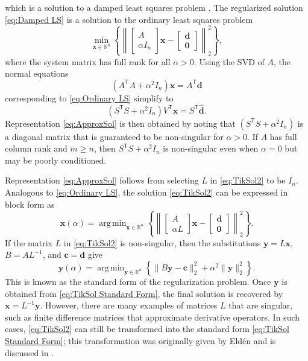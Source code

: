 \documentclass[12pt]{article}
\newcommand{\mA}{m}	%
\newcommand{\cVec}{\mathbf{c}}	%
\newcommand{\dVec}{\mathbf{d}}	%
\newcommand{\xVec}{\mathbf{x}}	%
\newcommand{\trans}[1]{{#1}^\mathsf{T}}	%
\newcommand{\regparam}{\alpha}  %
\DeclareMathOperator*{\argmin}{arg\,min}
\newcommand{\zeroVec}{\bm{0}}	%
\newcommand{\svd}[1]{\widehat{#1}}	%
\begin{document}
which is a solution to a damped least squares problem \cite{ABT}. The regularized solution \eqref{eq:Damped LS} is a solution to the ordinary least squares problem
\begin{equation}
\label{eq:Ordinary LS}
\min_{\xVec \in \mathbb{R}^n} \left\{\left\|
\begin{bmatrix}
A \\
\regparam I_n
\end{bmatrix}\xVec - 
\begin{bmatrix}
\dVec \\
\zeroVec
\end{bmatrix}
\right\|_2^2\right\},
\end{equation}
where the system matrix has full rank for all $\regparam > 0$. Using the SVD of $A$, the normal equations 
\[(\trans{A}A + \regparam^2 I_n)\xVec = \trans{A}\dVec\]
corresponding to \eqref{eq:Ordinary LS} simplify to
\[(\trans{S}S + \regparam^2 I_n)\trans{V}\xVec = \trans{S}\svd{\dVec}.\]
Representation \eqref{eq:ApproxSol} is then obtained by noting that $(\trans{S}S + \regparam^2 I_n)$ is a diagonal matrix that is guaranteed to be non-singular for $\regparam > 0$. If $A$ has full column rank and $\mA \geq n$, then $\trans{S}S + \regparam^2 I_n$ is non-singular even when $\regparam = 0$ but may be poorly conditioned. \par
Representation \eqref{eq:ApproxSol} follows from selecting $L$ in \eqref{eq:TikSol2} to be $I_n$. Analogous to \eqref{eq:Ordinary LS}, the solution \eqref{eq:TikSol2} can be expressed in block form as
\begin{equation}
\xVec(\regparam) = \argmin_{\xVec \in \mathbb{R}^n} \left\{\left\| \begin{bmatrix}
A \\
\regparam L
\end{bmatrix}\xVec - \begin{bmatrix}
\dVec \\
\bm{0}
\end{bmatrix} \right\|_2^2\right\}.
\label{eq:TikSol3}
\end{equation}
If the matrix $L$ in \eqref{eq:TikSol2} is non-singular, then the substitutions $\mathbf{y} = L\xVec$, $B = A{L}^{-1}$, and $\cVec = \dVec$ give
\begin{equation}
\mathbf{y}(\regparam) = \argmin_{\mathbf{y} \in \mathbb{R}^n} \left\{\|B\mathbf{y} - \cVec\|_2^2 + \regparam^2\|\mathbf{y}\|_2^2\right\}.
\label{eq:TikSol Standard Form}
\end{equation}
This is known as the standard form of the regularization problem. Once $\mathbf{y}$ is obtained from \eqref{eq:TikSol Standard Form}, the final solution is recovered by $\xVec = L^{-1}\mathbf{y}$.  However, there are many examples of matrices $L$ that are singular, such as finite difference matrices that approximate derivative operators. In such cases, \eqref{eq:TikSol2} can still be transformed into the standard form \eqref{eq:TikSol Standard Form}; this transformation was originally given by Eld\'{e}n \cite{Elden} and is discussed in \cite{Hansen:98}.
\end{document}
